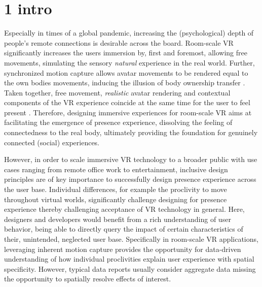 \section{1 intro}
Especially in times of a global pandemic, increasing the (psychological) depth of people's remote connections is desirable across the board. Room-scale VR significantly increases the users immersion by, first and foremost, allowing free movements, simulating the sensory \textit{natural} experience in the real world. Further, synchronized motion capture allows avatar movements to be rendered equal to the own bodies movements, inducing the illusion of body ownership transfer \cite{Kilteni2012}. Taken together, free movement, \textit{realistic} avatar rendering and contextual components of the VR experience coincide at the same time for the user to feel present \cite{Gonzalez-Franco2017}. Therefore, designing immersive experiences for room-scale VR aims at facilitating the emergence of presence experience, dissolving the feeling of connectedness to the real body, ultimately providing the foundation for genuinely connected (social) experiences. 

However, in order to scale immersive VR technology to a broader public with use cases ranging from remote office work to entertainment, inclusive design principles are of key importance to successfully design presence experience across the user base. Individual differences, for example the proclivity to move throughout virtual worlds, significantly challenge designing for presence experience thereby challenging acceptance of VR technology in general. Here, designers and developers would benefit from a rich understanding of user behavior, being able to directly query the impact of certain characteristics of their, unintended, neglected user base. Specifically in room-scale VR applications, leveraging inherent motion capture provides the opportunity for data-driven understanding of how individual proclivities explain user experience with spatial specificity. However, typical data reports usually consider aggregate data missing the opportunity to spatially resolve effects of interest.


